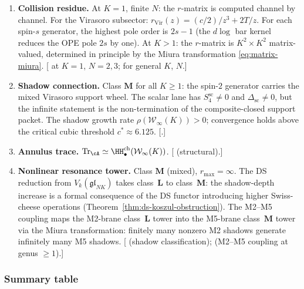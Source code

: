 \begin{conjecture}
\begin{enumerate}[label=\textup{(\roman*)},nosep]
\item \textbf{Collision residue.}
 At $K = 1$, finite $N$: the $r$-matrix is computed channel
 by channel. For the Virasoro subsector:
 $r_{\mathrm{Vir}}(z) = (c/2)/z^3 + 2T/z$.
 For each spin-$s$ generator, the highest pole order is $2s - 1$
 (the $d\log$ bar kernel reduces the OPE pole $2s$ by one). At $K > 1$: the
 $r$-matrix is $K^2 \times K^2$ matrix-valued, determined in
 principle by the Miura transformation
 \eqref{eq:matrix-miura}.
 \textup{[\ClaimStatusProvedHere{} at $K = 1$, $N = 2,3$;
 \ClaimStatusConjectured{} for general $K$, $N$.]}

\item \textbf{Shadow connection.}
 Class $\mathbf{M}$ for all $K \ge 1$:
 the spin-$2$ generator carries the mixed Virasoro support wheel.
 The scalar lane has \(S^{\mathrm{sc}}_4\ne0\) and
 \(\Delta_{\mathrm{sc}}\ne0\), but the infinite statement is the
 non-termination of the composite-closed support packet.
 The shadow growth rate $\rho(\mathcal{W}_\infty(K)) > 0$;
 convergence holds above the critical cubic threshold
 $c^* \approx 6.125$.
 \textup{[\ClaimStatusProvedHere.]}

\item \textbf{Annulus trace.}
 $\mathrm{Tr}_\cA \simeq
 \HH^{\mathrm{ch}}_\bullet(\mathcal{W}_\infty(K))$.
 \textup{[\ClaimStatusProvedHere{} (structural).]}

\item \textbf{Nonlinear resonance tower.}
 Class $\mathbf{M}$ (mixed), $r_{\max} = \infty$.
 The DS reduction from $V_k(\mathfrak{gl}_{NK})$ takes
 class~$\mathbf{L}$ to class~$\mathbf{M}$: the shadow-depth
 increase is a formal consequence of the DS functor
 introducing higher Swiss-cheese operations
 \textup{(}Theorem~\textup{\ref{thm:ds-koszul-obstruction}}\textup{)}.
 The M2--M5 coupling maps the M2-brane
 class~$\mathbf{L}$ tower into the M5-brane
 class~$\mathbf{M}$ tower via the Miura transformation:
 finitely many nonzero M2 shadows generate infinitely many
 M5 shadows.
 \textup{[\ClaimStatusProvedHere{} (shadow classification);
 \ClaimStatusConjectured{} (M2--M5 coupling at genus $\ge 1$).]}
\end{enumerate}
\end{conjecture}


\subsubsection{Summary table}
\label{subsubsec:platonic-summary-table}

